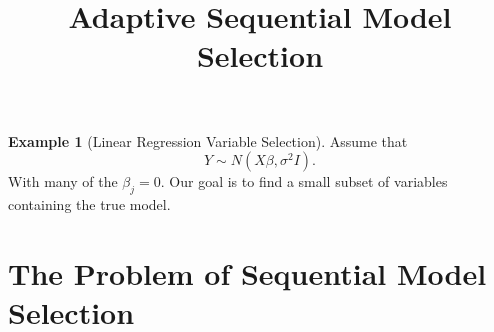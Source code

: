 \documentclass{article}
\begin{document}
\newtheorem{theorem}{Theorem}
\newtheorem{corollary}[theorem]{Corollary}
\newtheorem{lemma}[theorem]{Lemma}
\newtheorem{observation}[theorem]{Observation}
\newtheorem{proposition}[theorem]{Proposition}
\newtheorem{definition}[theorem]{Definition}
\newtheorem{claim}[theorem]{Claim}
\newtheorem{fact}[theorem]{Fact}
\newtheorem{assumption}[theorem]{Assumption}
\newtheorem{model}[theorem]{Model}

\theoremstyle{definition}
\newtheorem{example}{Example}

\newcommand{\cM}{\mathcal{M}}
\newcommand{\cH}{\mathcal{H}}
\newcommand{\cD}{\mathcal{D}}
\newcommand{\FDR}{\textnormal{FDR}}
\newcommand{\FCR}{\textnormal{FCR}}
\newcommand{\crt}{\phi}
\newcommand{\M}{\mathcal{M}}
\newcommand{\cY}{\mathcal{Y}}
\newcommand{\cX}{\mathcal{X}}
\newcommand{\cV}{\mathcal{V}}
\newcommand{\bX}{\mathbf{X}}
\newcommand{\x}{\mathbf{x}}
\newcommand{\Gv}{\;\;\big|\;\;}
\newcommand{\proj}{\cP}
\newcommand{\pow}{\text{Pow}}
\newcommand{\sF}{\mathscr{F}}
\newcommand{\cF}{\mathcal{F}}
\newcommand{\sC}{\mathscr{C}}
\newcommand{\hJ}{\widehat{J}}
\newcommand{\bH}{\mathbf{H}}
\newcommand{\bM}{\mathbf{M}}
\newcommand{\hK}{\widehat{K}}
\newcommand{\leqAS}{\overset{\textrm{a.s.}}{\leq}}


\newcommand*\mystrut{\vrule width0pt height0pt depth1.5ex\relax}
\newcommand{\underlabel}{\underbracket[1pt][.5pt]{\mystrut \quad\;\; \sub \quad\;\; }}
\newcommand{\JTcomment}[1]{{\color{blue}{(JT: \bf \sc #1) }}}
\newcommand{\WFcomment}[1]{{\color{red}{(WF: \bf \sc #1) }}}

\title{Adaptive Sequential Model Selection}
\maketitle

\begin{abstract}
  
\end{abstract}


\begin{example}[Linear Regression Variable Selection]\label{ex:linReg}
  Assume that
  \begin{equation}
    Y \sim N(X\beta, \sigma^2I).
  \end{equation}
  With many of the $\beta_j=0$. Our goal is to find a small subset of variables containing the true model.
\end{example}

\section{The Problem of Sequential Model Selection}
\end{document}
